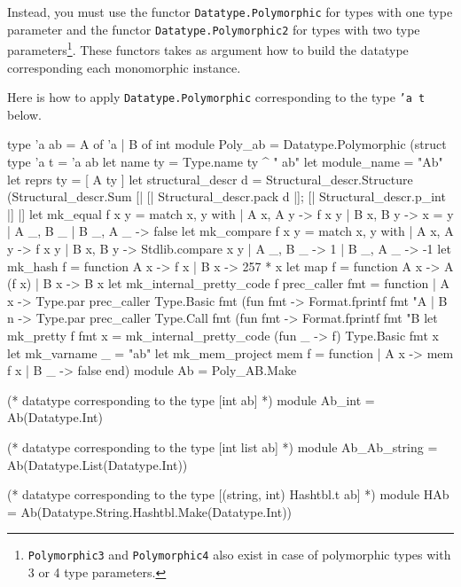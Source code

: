 Instead, you must use the functor
\texttt{Datatype.Polymorphic} for types with one
type parameter and the functor
\texttt{Datatype.Polymorphic2} for types with
two type parameters\footnote{%
\texttt{Polymorphic3} and 
\texttt{Polymorphic4}
also exist in case of polymorphic types with 3 or 4 type parameters.}.
These functors takes as argument how to build the datatype
corresponding each monomorphic instance.

\begin{example}
Here is how to apply \texttt{Datatype.Polymorphic} corresponding to the type
\texttt{'a t} below.
\begin{ocamlcode}
type 'a ab = A of 'a | B of int
module Poly_ab = 
  Datatype.Polymorphic
    (struct
       type 'a t = 'a ab
       let name ty = Type.name ty ^ " ab"
       let module_name = "Ab"
       let reprs ty = [ A ty ]
       let structural_descr d = 
         Structural_descr.Structure 
          (Structural_descr.Sum
            [| [| Structural_descr.pack d |]; [| Structural_descr.p_int |] |]
       let mk_equal f x y = match x, y with
         | A x, A y -> f x y
         | B x, B y -> x = y
         | A _, B _ | B _, A _ -> false
       let mk_compare f x y =  match x, y with
         | A x, A y -> f x y
         | B x, B y -> Stdlib.compare x y
         | A _, B _ -> 1
         | B _, A _ -> -1
      let mk_hash f = function A x -> f x | B x -> 257 * x
      let map f = function A x -> A (f x) | B x -> B x
      let mk_internal_pretty_code f prec_caller fmt = function
        | A x ->
          Type.par 
            prec_caller 
            Type.Basic 
            fmt 
            (fun fmt -> Format.fprintf fmt "A %
        | B n ->
          Type.par 
            prec_caller 
            Type.Call 
            fmt 
            (fun fmt -> Format.fprintf fmt "B %
      let mk_pretty f fmt x = 
        mk_internal_pretty_code (fun _ -> f) Type.Basic fmt x
      let mk_varname _ = "ab"
      let mk_mem_project mem f = function
        | A x -> mem f x
        | B _ -> false
     end)
module Ab = Poly_AB.Make

(* datatype corresponding to the type [int ab] *)
module Ab_int = Ab(Datatype.Int)

(* datatype corresponding to the type [int list ab] *)
module Ab_Ab_string = Ab(Datatype.List(Datatype.Int))

(* datatype corresponding to the type [(string, int) Hashtbl.t ab] *)
module HAb = Ab(Datatype.String.Hashtbl.Make(Datatype.Int))
\end{ocamlcode}
\end{example}
